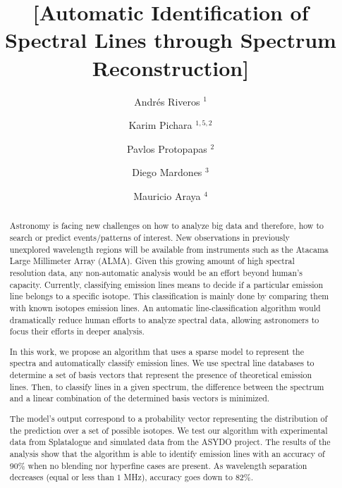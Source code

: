 \documentclass[iop,apj]{emulateapj}
\begin{document}
\title{[Automatic Identification of Spectral Lines through Spectrum Reconstruction]}
\author{Andr\'es Riveros	$^1$}
\author{Karim Pichara		$^{1,5, 2}$}
\author{Pavlos Protopapas	$^2$}
\author{Diego Mardones		$^3$}
\author{Mauricio Araya		$^4$}

\begin{abstract}

\begin{comment}
    - Massive Amount of Data
    - Astronomers overloaded
    - What is spectroscopy
    - Need to automatize process
    - Step by step task of astronomer
    - Focus of this work
    - Automatic Proposed Algorithm
    - Detailing Algorithm Operation
    - Reached Results
    - Strengths and limitations
    - Conclusions
\end{comment}


Astronomy is facing new challenges on how to analyze big data and therefore, how to search or predict events/patterns of interest.
New observations in previously unexplored wavelength regions will be available from instruments such as the Atacama Large Millimeter Array (ALMA).
Given this growing amount of high spectral resolution data, any non-automatic analysis would be an effort beyond human's capacity.
Currently, classifying emission lines means to decide if a particular emission line belongs to a specific isotope. 
This classification is mainly done by comparing them with known isotopes emission lines.
An automatic line-classification algorithm would dramatically reduce human efforts to analyze spectral data, allowing astronomers to focus their efforts in deeper analysis.

In this work, we propose an algorithm that uses a sparse model to represent the spectra and automatically classify emission lines.
We use spectral line databases to determine a set of basis vectors that represent the presence of theoretical emission lines.
Then, to classify lines in a given spectrum, the difference between the spectrum and a linear combination of the determined basis vectors is minimized.

The model's output correspond to a probability vector representing the distribution of the prediction over a set of possible isotopes. 
We test our algorithm with experimental data from Splatalogue and simulated data from the ASYDO project.
The results of the analysis show that the algorithm is able to identify emission lines with an accuracy of 90\% when no blending nor hyperfine cases are present.
As wavelength separation decreases (equal or less than $1$ MHz), accuracy goes down to 82\%.


\end{abstract}
\end{document}
